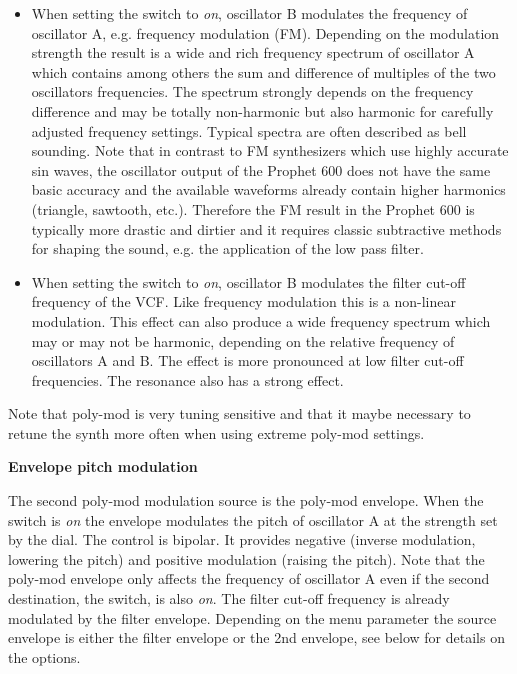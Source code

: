 \begin{itemize}
  \item When setting the \polymodfreq switch to \textit{on}, oscillator B modulates the frequency of oscillator A, e.g. frequency modulation (FM). Depending on the modulation strength the result is a wide and rich frequency spectrum of oscillator A which contains among others the sum and difference of multiples of the two oscillators frequencies. The spectrum strongly depends on the frequency difference and may be totally non-harmonic but also harmonic for carefully adjusted frequency settings. Typical spectra are often described as bell sounding. Note that in contrast to FM synthesizers which use highly accurate sin waves, the oscillator output of the Prophet 600 does not have the same basic accuracy and the available waveforms already contain higher harmonics (triangle, sawtooth, etc.). Therefore the FM result in the Prophet 600 is typically more drastic and dirtier and it requires classic subtractive methods for shaping the sound, e.g. the application of the low pass filter. 
  \item When setting the \polymodfilter switch to \textit{on}, oscillator B modulates the filter cut-off frequency of the VCF. Like frequency modulation this is a non-linear modulation. This effect can also produce a wide frequency spectrum which may or may not be harmonic, depending on the relative frequency of oscillators A and B. The effect is more pronounced at low filter cut-off frequencies. The resonance also has a strong effect.  
\end{itemize}

Note that poly-mod is very tuning sensitive and that it maybe necessary to retune the synth more often when using extreme poly-mod settings.

\textbf{Envelope pitch modulation}

The second poly-mod modulation source is the poly-mod envelope. When the \polymodfreq switch is \textit{on} the envelope modulates the pitch of oscillator A at the strength set by the \polymodenv dial. The \polymodenv control is bipolar. It  provides negative (inverse modulation, lowering the pitch) and positive modulation (raising the pitch). Note that the poly-mod envelope only affects the frequency of oscillator A even if the second destination, the \polymodfilter switch, is also \textit{on}. The filter cut-off frequency is already modulated by the filter envelope. Depending on the menu parameter \envrouting the source envelope is either the filter envelope or the 2nd envelope, see below for details on the options.

